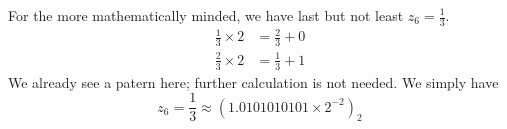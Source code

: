 \begin{exmp}
    For the more mathematically minded, we have last but not least \(z_6 = \frac{1}{3}\).
    \begin{align*}
        \frac{1}{3} \times 2 &= \frac{2}{3} + 0 \\
        \frac{2}{3} \times 2 &= \frac{1}{3} + 1
    \end{align*}
    We already see a patern here; further calculation is not needed. We simply have
    \begin{equation*}
        z_6 = \frac{1}{3} \approx (1.0101010101 \times 2^{-2})_2
    \end{equation*}
\end{exmp}